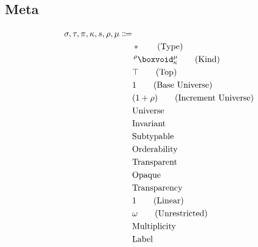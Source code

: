 \documentclass {article}
\begin{document}
\subsection{Meta}
\begin{align*}
\sigma, \tau, \pi, \kappa, s, \rho, \mu \Coloneqq & \\
& * \tag{Type} \\
& \prescript {\rho} {} \boxvoid^\mu_{\kappa} \tag{Kind} \\
& \top \tag{Top} \\
& 1 \tag{Base Universe} \\
& (1 + \rho) \tag{Increment Universe} \\
& \text{Universe} \\
& \text{Invariant} \\
& \text{Subtypable} \\
& \text{Orderability} \\
& \text{Transparent} \\
& \text{Opaque} \\
& \text{Transparency} \\
& 1 \tag{Linear} \\
& \omega \tag{Unrestricted} \\
& \text{Multiplicity} \\
& \text{Label}
\end{align*}
\end{document}
